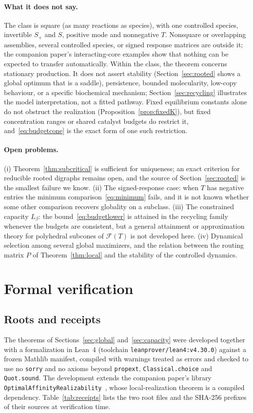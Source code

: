 \documentclass[11pt,a4paper]{article}
\theoremstyle{plain}
\theoremstyle{definition}
\theoremstyle{remark}
\numberwithin{equation}{section}
\newcommand{\Sp}{S_{+}}
\newcommand{\cone}{\mathcal{F}}
\begin{document}
\paragraph{What it does not say.}
The class is square (as many reactions as species), with one controlled species, invertible $\Sp$ and $S$, positive mode and nonnegative $T$. Nonsquare or overlapping assemblies, several controlled species, or signed response matrices are outside it; the companion paper's interacting-core examples show that nothing can be expected to transfer automatically. Within the class, the theorem concerns stationary production. It does not assert stability (Section~\ref{sec:rooted} shows a global optimum that is a saddle), persistence, bounded molecularity, low-copy behaviour, or a specific biochemical mechanism; Section~\ref{sec:recycling} illustrates the model interpretation, not a fitted pathway. Fixed equilibrium constants alone do not obstruct the realization (Proposition~\ref{prop:fixedK}), but fixed concentration ranges or shared catalyst budgets do restrict it, and~\eqref{eq:budgetcone} is the exact form of one such restriction.

\paragraph{Open problems.}
(i) Theorem~\ref{thm:subcritical} is sufficient for uniqueness; an exact criterion for reducible rooted digraphs remains open, and the source of Section~\ref{sec:rooted} is the smallest failure we know. (ii) The signed-response case: when $T$ has negative entries the minimum comparison~\eqref{eq:minimum} fails, and it is not known whether some other comparison recovers globality on a subclass. (iii) The constrained capacity $L_\beta$: the bound~\eqref{eq:budgetlower} is attained in the recycling family whenever the budgets are consistent, but a general attainment or approximation theory for polyhedral subcones of $\cone(T)$ is not developed here. (iv) Dynamical selection among several global maximizers, and the relation between the routing matrix $P$ of Theorem~\ref{thm:local} and the stability of the controlled dynamics.

\section{Formal verification}\label{sec:formal}

\subsection{Roots and receipts}
The theorems of Sections~\ref{sec:global} and~\ref{sec:capacity} were developed together with a formalization in Lean~4 (toolchain \texttt{leanprover/lean4:v4.30.0}) against a frozen Mathlib manifest, compiled with warnings treated as errors and checked to use no \texttt{sorry} and no axioms beyond \texttt{propext}, \texttt{Classical.choice} and \texttt{Quot.sound}. The development extends the companion paper's library \texttt{OptimalAffinityRealizability}~\citep{companion2026}, whose local-realization theorem is a compiled dependency. Table~\ref{tab:receipts} lists the two root files and the SHA-256 prefixes of their sources at verification time.
\end{document}
